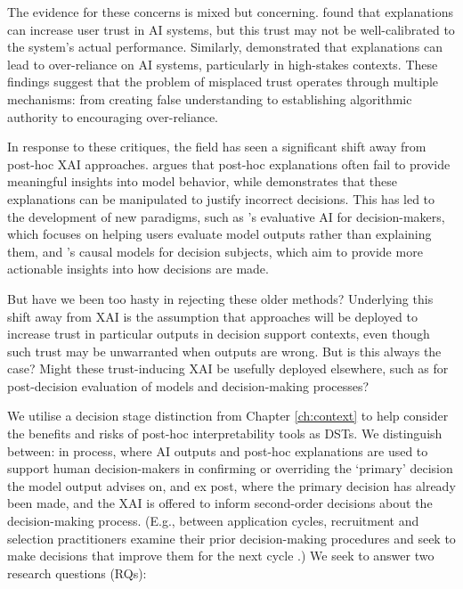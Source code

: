 The evidence for these concerns is mixed but concerning. \textcite{lai_human_2019} found that explanations can increase user trust in AI systems, but this trust may not be well-calibrated to the system's actual performance. Similarly, \textcite{jacobs_how_2021} demonstrated that explanations can lead to over-reliance on AI systems, particularly in high-stakes contexts. These findings suggest that the problem of misplaced trust operates through multiple mechanisms: from creating false understanding to establishing algorithmic authority to encouraging over-reliance.

In response to these critiques, the field has seen a significant shift away from post-hoc XAI approaches. \textcite{kumar_problems_2020} argues that post-hoc explanations often fail to provide meaningful insights into model behavior, while \textcite{Bastounis_Campodonico_vanderSchaar_Adcock_Hansen_2024} demonstrates that these explanations can be manipulated to justify incorrect decisions. This has led to the development of new paradigms, such as \textcite{miller_explainable_2023}'s evaluative AI for decision-makers, which focuses on helping users evaluate model outputs rather than explaining them, and \textcite{karimi_algorithmic_2021}'s causal models for decision subjects, which aim to provide more actionable insights into how decisions are made.

But have we been too hasty in rejecting these older methods? Underlying this shift away from XAI is the assumption that approaches will be deployed to increase trust in particular outputs in decision support contexts, even though such trust may be unwarranted when outputs are wrong. But is this always the case? Might these trust-inducing XAI be usefully deployed elsewhere, such as for post-decision evaluation of models and decision-making processes?

We utilise a decision stage distinction from Chapter \ref{ch:context} to help consider the benefits and risks of post-hoc interpretability tools as DSTs. We distinguish between: in process, where AI outputs and post-hoc explanations are used to support human decision-makers in confirming or overriding the `primary' decision the model output advises on, and ex post, where the primary decision has already been made, and the XAI is offered to inform second-order decisions about the decision-making process. (E.g., between application cycles, recruitment and selection practitioners examine their prior decision-making procedures and seek to make decisions that improve them for the next cycle \cite{li2020hiring}.) We seek to answer two research questions (RQs):


